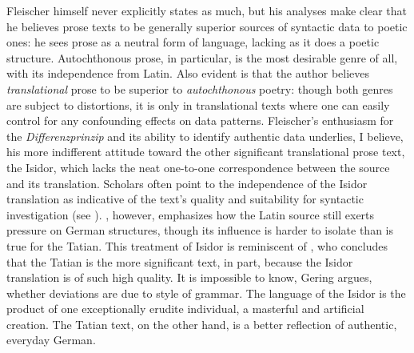 \noindent Fleischer himself never explicitly states as much, but his analyses make clear that he believes prose texts to be generally superior sources of syntactic data to poetic ones: he sees prose as a neutral form of language, lacking as it does a poetic structure. Autochthonous prose, in particular, is the most desirable genre of all, with its independence from Latin. Also evident is that the author believes \textit{translational} prose to be superior to \textit{autochthonous} poetry: though both genres are subject to distortions, it is only in translational texts where one can easily control for any confounding effects on data patterns. Fleischer’s enthusiasm for the \textit{Differenzprinzip} and its ability to identify authentic data underlies, I believe, his more indifferent attitude toward the other significant translational prose text, the Isidor, which lacks the neat one-to-one correspondence between the source and its translation. Scholars often point to the independence of the Isidor translation as indicative of the text’s quality and suitability for syntactic investigation (see \citealt[3]{Robinson1997}). \citet[33--34]{Fleischer2006}, however, emphasizes how the Latin source still exerts pressure on German structures, though its influence is harder to isolate than is true for the Tatian. This treatment of Isidor is reminiscent of \citet{Gering1876}, who concludes that the Tatian is the more significant text, in part, because the Isidor translation is of such high quality. It is impossible to know, Gering argues, whether deviations are due to style of grammar. The language of the Isidor is the product of one exceptionally erudite individual, a masterful and artificial creation. The Tatian text, on the other hand, is a better reflection of authentic, everyday German.

